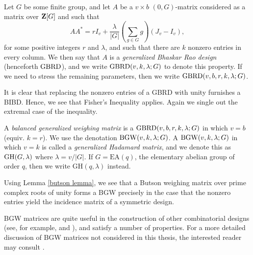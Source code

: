 \documentclass[../../../main]{subfiles}
\begin{document}
\begin{defin}\label{gbrd definition}
  Let $G$ be some finite group, and let $A$ be a $v \times b$ $(0,G)$-matrix
  considered as a matrix over $\mathbf{Z}[G]$ and such that 
  \begin{equation}\label{gbrd-eq}
    AA^* = rI_v + \frac{\lambda}{|G|}\left(\sum_{g \in G}g\right)(J_v - I_v),
  \end{equation}
  for some positive integers $r$ and $\lambda$, and such that there are $k$ nonzero entries in every column. We then say that $A$ is a {\it generalized Bhaskar Rao design} (henceforth $\text{GBRD}$), and we write $\text{GBRD}(v,k,\lambda;G)$ to denote this property. If we need to stress the remaining parameters, then we write $\text{GBRD}(v,b,r,k,\lambda;G)$.
\end{defin}

It is clear that replacing the nonzero entries of a GBRD with unity furnishes a
BIBD. Hence, we see that Fisher's Inequality applies. Again we single out the
extremal case of the inequality.

\begin{defin}\label{bgw definition}
  A {\it balanced generalized weighing matrix} is a $\text{GBRD}(v,b,r,k,\lambda;G)$
  in which $v = b$ (equiv. $k = r$). We use the denotation
  $\text{BGW}(v,k,\lambda;G)$. A $\text{BGW}(v,k,\lambda;G)$ in which $v = k$ is called a
  {\it generalized Hadamard matrix}, and we denote this as $\text{GH}(G,\lambda)$
  where $\lambda = v/|G|$. If $G = \mathrm{EA}(q)$, the elementary abelian
  group of order $q$, then we
  write $\mathrm{GH}(q,\lambda)$ instead. 
\end{defin}

Using Lemma \ref{butson lemma}, we see that a Butson weighing matrix over prime
complex roots of unity forms a BGW precisely in the case that the nonzero
entries yield the incidence matrix of a symmetric design.


BGW matrices are quite useful in the construction of other combinatorial designs
(see, for example, \citeauthor{ionin-kharaghani-drad}
\citeyear{ionin-kharaghani-drad} and \citeyear{ionin-kharaghani-srg}), and
satisfy a number of properties. For a more detailed discussion of BGW matrices
not considered in this thesis, the interested reader may consult
\cite{combinatorics-of-symmetric-designs}. 
\end{document}

